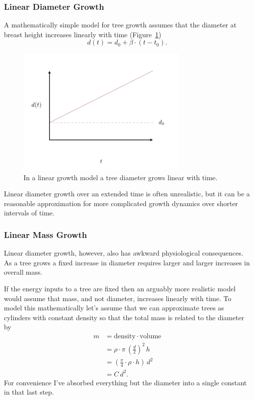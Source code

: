 \documentclass[
  letterpaper,
  DIV=11,
  numbers=noendperiod]{scrartcl}
\begin{document}
\hypertarget{linear-diameter-growth}{%
\subsubsection{Linear Diameter Growth}\label{linear-diameter-growth}}

A mathematically simple model for tree growth assumes that the diameter
at breast height increases linearly with time (Figure~\ref{fig-linear})
\[
d(t) = d_{0} + \beta \cdot (t - t_{0}).
\]

\begin{figure}

{\centering \includegraphics[width=0.75\textwidth,height=\textheight]{figures/growth/linear/linear.pdf}

}

\caption{\label{fig-linear}In a linear growth model a tree diameter
grows linear with time.}

\end{figure}

Linear diameter growth over an extended time is often unrealistic, but
it can be a reasonable approximation for more complicated growth
dynamics over shorter intervals of time.

\hypertarget{linear-mass-growth}{%
\subsubsection{Linear Mass Growth}\label{linear-mass-growth}}

Linear diameter growth, however, also has awkward physiological
consequences. As a tree grows a fixed increase in diameter requires
larger and larger increases in overall mass.

If the energy inputs to a tree are fixed then an arguably more realistic
model would assume that mass, and not diameter, increases linearly with
time. To model this mathematically let's assume that we can approximate
trees as cylinders with constant density so that the total mass is
related to the diameter by \begin{align*}
m
&=
\text{density} \cdot \text{volume}
\\
&=
\rho \cdot \pi \, \left( \frac{d}{2} \right)^{2} \, h
\\
&=
\left( \frac{\pi}{4} \cdot \rho \cdot h \right) \, d^{2}
\\
&=
C \, d^{2}.
\end{align*} For convenience I've absorbed everything but the diameter
into a single constant in that last step.
\end{document}
